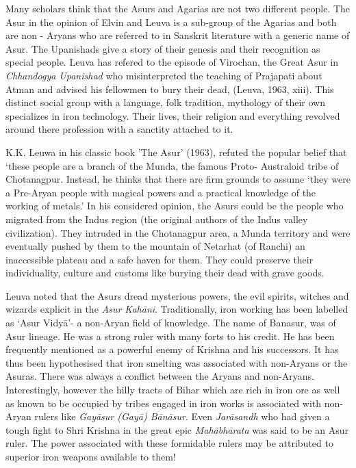 Many scholars think that the Asurs and Agarias are not two different people. The Asur in the opinion of Elvin and Leuva is a sub-group of the Agarias and both are non - Aryans who are referred to in Sanskrit literature with a generic name of Asur. The Upanishads give a story of their genesis and their recognition as special people. Leuva has refered to the episode of Virochan, the Great Asur in {\it Chhandogya Upanishad} who misinterpreted the teaching of Prajapati about Atman and advised his fellowmen to bury their dead, (Leuva, 1963, xiii). This distinct social group with a language, folk tradition, mythology of their own specializes in iron technology. Their lives, their religion and everything revolved around there profession with a sanctity attached to it. 

K.K. Leuwa in his classic book 'The Asur’ (1963), refuted the popular belief that ‘these people are a branch of the Munda, the famous Proto- Australoid tribe of Chotanagpur. Instead, he thinks that there are firm grounds to assume ‘they were a Pre-Aryan people with magical powers and a practical knowledge of the working of metals.’ In his considered opinion, the Asurs could be the people who migrated from the Indus region (the original authors of the Indus valley civilization). They intruded in the Chotanagpur area, a Munda territory and were eventually pushed by them to the mountain of Netarhat (of Ranchi) an inaccessible plateau and a safe haven for them. They could preserve their individuality, culture and customs like burying their dead with grave goods. 

Leuva noted that the Asurs dread mysterious powers, the evil spirits, witches and wizards explicit in the {\it Asur Kahāni}. Traditionally, iron working has been labelled as ‘Asur Vidyā’- a non-Aryan field of knowledge. The name of Banasur, was of Asur lineage. He was a strong ruler with many forts to his credit. He has been frequently mentioned as a powerful enemy of Krishna and his successors. It has thus been hypothesised that iron smelting was associated with non-Aryans or the Asuras. There was always a conflict between the Aryans and non-Aryans. Interestingly, however the hilly tracts of Bihar which are rich in iron ore as well as known to be occupied by tribes engaged in iron works is associated with non-Aryan rulers like {\it Gayāsur (Gayā) Bānāsur}. Even {\it Jarāsandh} who had given a tough fight to Shri Krishna in the great epic {\it Mahābhārata} was said to be an Asur ruler. The power associated with these formidable rulers may be attributed to superior iron weapons available to them!

